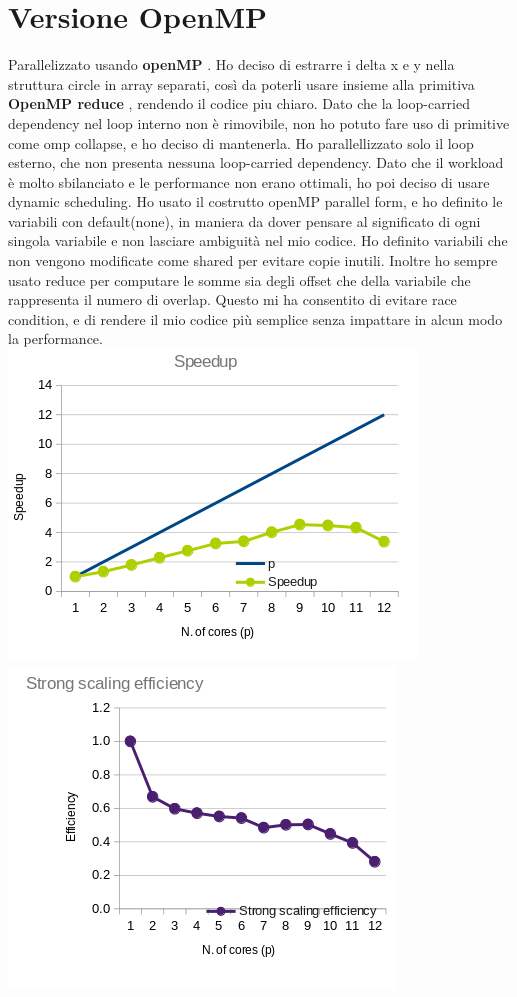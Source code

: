\documentclass[a4paper,12pt, twoside]{report}
\begin{document}
\section*{Versione OpenMP}
Parallelizzato usando \textbf{openMP} \cite{openMP}.
Ho deciso di estrarre i delta x e y nella struttura circle in array separati, così da poterli usare insieme alla primitiva \textbf{OpenMP reduce} \cite{omp_reduce}, rendendo il codice piu chiaro.
Dato che la loop-carried dependency nel loop interno non è rimovibile, non ho potuto fare uso di primitive come omp collapse, e ho deciso di mantenerla.
Ho parallellizzato solo il loop esterno, che non presenta nessuna loop-carried dependency.
Dato che il workload è molto sbilanciato e le performance non erano ottimali, ho poi deciso di usare dynamic scheduling.
Ho usato il costrutto openMP parallel form, e ho definito le variabili con default(none), in maniera da dover pensare al significato di ogni singola variabile e non lasciare ambiguità nel mio codice. Ho definito variabili che non vengono modificate come shared per evitare copie inutili.
Inoltre ho sempre usato  reduce per computare le somme sia degli offset che della variabile che rappresenta il numero di overlap.
Questo mi ha consentito di evitare race condition, e di rendere il mio codice più semplice senza impattare in alcun modo la performance.
\newline
\includegraphics[scale=0.5]{images/omp_speedup.png}
\includegraphics[scale=0.5]{images/omp_strong.png}
\end{document}
